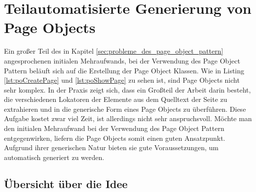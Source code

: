 
\chapter{Teilautomatisierte Generierung von Page Objects}
\label{sec:teilautomatisierte_generierung_von_pageObjects}

Ein großer Teil des in Kapitel \ref{sec:probleme_des_page_object_pattern} angesprochenen initialen Mehraufwands, bei der Verwendung des Page Object Pattern beläuft sich auf die Erstellung der Page Object Klassen.
Wie in Listing \ref{lst:poCreatePage} und \ref{lst:poShowPage} zu sehen ist, sind Page Objects nicht sehr komplex. In der Praxis zeigt sich, dass ein Großteil der Arbeit darin besteht, die verschiedenen Lokatoren der Elemente aus dem Quelltext der Seite zu extrahieren und in die generische Form eines Page Objects zu überführen.
Diese Aufgabe kostet zwar viel Zeit, ist allerdings nicht sehr anspruchsvoll.
Möchte man den initialen Mehraufwand bei der Verwendung des Page Object Pattern entgegenwirken, liefern die Page Objects somit einen guten Ansatzpunkt.
Aufgrund ihrer generischen Natur bieten sie gute Voraussetzungen, um automatisch generiert zu werden.
\section{Übersicht über die Idee}
\label{sec:uebersicht_ueber_idee}


